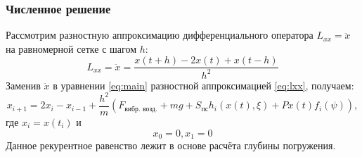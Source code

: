\documentclass{beamer}
\begin{document}
    \begin{frame}
        \frametitle{Численное решение}
        Рассмотрим разностную аппроксимацию дифференциального оператора $L_{xx} = \ddot{x}$ на равномерной сетке с шагом $h$:
        \begin{equation}
            \label{eq:lxx}
            L_{xx} = \ddot{x} = \frac{x(t + h) - 2x(t) + x(t - h)}{h^2}
        \end{equation}
        Заменив $\ddot{x}$ в уравнении \ref{eq:main} разностной аппроксимацией \ref{eq:lxx}, получаем:
        \begin{equation*}
                x_{i+1} = 2x_i - x_{i-1} + \frac{h^2}{m}(F_\text{вибр. возд.} + mg + S_\text{пс} h_i(x(t), \xi) + P x(t) f_i(\psi)),
        \end{equation*}
        где $x_i = x(t_i)$ и 
        \begin{equation*}
            x_0 = 0, x_1 = 0
        \end{equation*}
        Данное рекурентное равенство лежит в основе расчёта глубины погружения.
    \end{frame}
\end{document}
